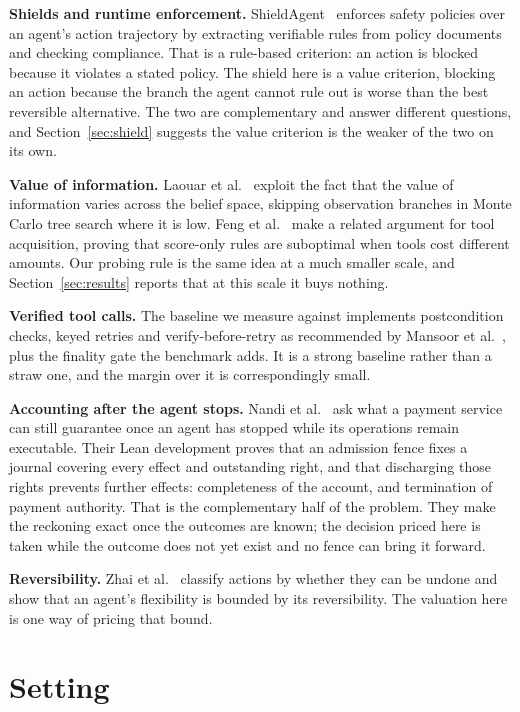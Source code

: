 \documentclass[conference]{IEEEtran}
\begin{document}
\textbf{Shields and runtime enforcement.} ShieldAgent~\cite{shieldagent}
enforces safety policies over an agent's action trajectory by extracting
verifiable rules from policy documents and checking compliance. That is a
rule-based criterion: an action is blocked because it violates a stated policy.
The shield here is a value criterion, blocking an action because the branch the
agent cannot rule out is worse than the best reversible alternative. The two are
complementary and answer different questions, and Section~\ref{sec:shield}
suggests the value criterion is the weaker of the two on its own.

\textbf{Value of information.} Laouar et al.~\cite{voimcp} exploit the fact that
the value of information varies across the belief space, skipping observation
branches in Monte Carlo tree search where it is low. Feng et
al.~\cite{coststopping} make a related argument for tool acquisition, proving
that score-only rules are suboptimal when tools cost different amounts. Our
probing rule is the same idea at a much smaller scale, and
Section~\ref{sec:results} reports that at this scale it buys nothing.

\textbf{Verified tool calls.} The baseline we measure against implements
postcondition checks, keyed retries and verify-before-retry as recommended by
Mansoor et al.~\cite{verifiedtools}, plus the finality gate the benchmark adds.
It is a strong baseline rather than a straw one, and the margin over it is
correspondingly small.

\textbf{Accounting after the agent stops.} Nandi et
al.~\cite{trustbound} ask what a payment service can still guarantee once an
agent has stopped while its operations remain executable. Their Lean
development proves that an admission fence fixes a journal covering every
effect and outstanding right, and that discharging those rights prevents
further effects: completeness of the account, and termination of payment
authority. That is the complementary half of the problem. They make the
reckoning exact once the outcomes are known; the decision priced here is taken
while the outcome does not yet exist and no fence can bring it forward.

\textbf{Reversibility.} Zhai et al.~\cite{revisable} classify actions by whether
they can be undone and show that an agent's flexibility is bounded by its
reversibility. The valuation here is one way of pricing that bound.

\section{Setting}
\end{document}
